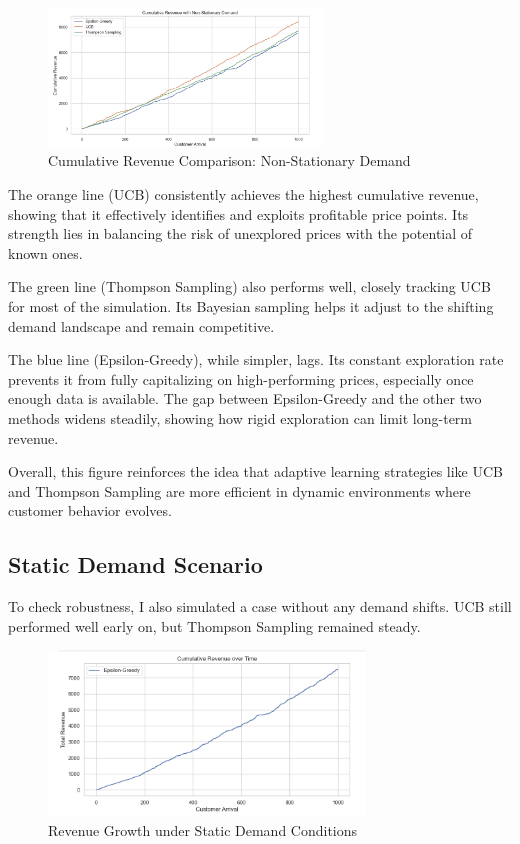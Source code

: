 \documentclass[12pt]{article}
\begin{document}
\begin{figure}[h!]
  \centering
  \includegraphics[width=0.65\textwidth]{figures/cumulative revenue with non stationary demand.png}
  \caption{Cumulative Revenue Comparison: Non-Stationary Demand}
  \label{fig:nonstationary-revenue}
\end{figure}

The orange line (UCB) consistently achieves the highest cumulative revenue, showing that it effectively identifies and exploits profitable price points. Its strength lies in balancing the risk of unexplored prices with the potential of known ones. 

The green line (Thompson Sampling) also performs well, closely tracking UCB for most of the simulation. Its Bayesian sampling helps it adjust to the shifting demand landscape and remain competitive.

The blue line (Epsilon-Greedy), while simpler, lags. Its constant exploration rate prevents it from fully capitalizing on high-performing prices, especially once enough data is available. The gap between Epsilon-Greedy and the other two methods widens steadily, showing how rigid exploration can limit long-term revenue.

Overall, this figure reinforces the idea that adaptive learning strategies like UCB and Thompson Sampling are more efficient in dynamic environments where customer behavior evolves.

\subsection*{Static Demand Scenario}
To check robustness, I also simulated a case without any demand shifts. UCB still performed well early on, but Thompson Sampling remained steady.

\begin{figure}[h!]
  \centering
  \includegraphics[width=0.75\textwidth]{figures/cumulative revenue over time.png}
  \caption{Revenue Growth under Static Demand Conditions}
  \label{fig:static-revenue}
\end{figure}
\end{document}

